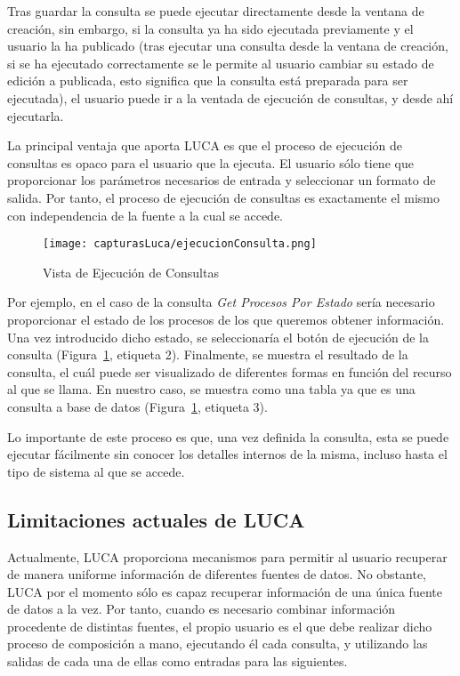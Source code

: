 Tras guardar la consulta se puede ejecutar directamente desde la ventana de creación, sin embargo, si la consulta ya ha sido ejecutada previamente y el usuario la ha publicado (tras ejecutar una consulta desde la ventana de creación, si se ha ejecutado correctamente se le permite al usuario cambiar su estado de edición a publicada, esto significa que la consulta está preparada para ser ejecutada), el usuario puede ir a la ventada de ejecución de consultas, y desde ahí ejecutarla.

La principal ventaja que aporta LUCA es que el proceso de ejecución de consultas es opaco para el usuario que la ejecuta. El usuario sólo tiene que proporcionar los parámetros necesarios de entrada y seleccionar un formato de salida. Por tanto, el proceso de ejecución de consultas es exactamente el mismo con independencia de la fuente a la cual se accede.

\begin{figure}[H]
	\centering
	\texttt{[image: capturasLuca/ejecucionConsulta.png]}
	\caption{Vista de Ejecución de Consultas}\label{fig:ejecucionConsultas}
\end{figure}

Por ejemplo, en el caso de la consulta \emph{Get Procesos Por Estado} sería necesario proporcionar el estado de los procesos de los que queremos obtener información. Una vez introducido dicho estado, se seleccionaría el botón de ejecución de la consulta (Figura~\ref{fig:ejecucionConsultas}, etiqueta 2). Finalmente, se muestra el resultado de la consulta, el cuál puede ser visualizado de diferentes formas en función del recurso al que se llama. En nuestro caso, se muestra como una tabla ya que es una consulta a base de datos (Figura~\ref{fig:ejecucionConsultas}, etiqueta 3).

Lo importante de este proceso es que, una vez definida la consulta, esta se puede ejecutar fácilmente sin conocer los detalles internos de la misma, incluso hasta el tipo de sistema al que se accede.



\subsection{Limitaciones actuales de LUCA}

Actualmente, LUCA proporciona mecanismos para permitir al usuario recuperar de manera uniforme información de diferentes fuentes de datos. No obstante, LUCA por el momento sólo es capaz recuperar información de una única fuente de datos a la vez. Por tanto, cuando es necesario combinar información procedente de distintas fuentes, el propio usuario es el que debe realizar dicho proceso de composición a mano, ejecutando él cada consulta, y utilizando las salidas de cada una de ellas como entradas para las siguientes.



